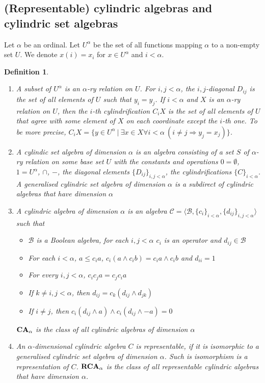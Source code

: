 \documentclass[a4paper]{article}
\theoremstyle{defin}
\newtheorem{defin}{Definition}
\theoremstyle{theorem}
\theoremstyle{prop}
\theoremstyle{lemma}
\theoremstyle{ex}
\theoremstyle{col}
\begin{document}
\subsection{(Representable) cylindric algebras and cylindric set algebras}

Let $\alpha$ be an ordinal. Let $U^{\alpha}$ be the set of all functions mapping $\alpha$ to a non-empty set $U$. We denote $x(i) = x_i$ for
$x \in U^{\alpha}$ and $i < \alpha$.

\begin{defin}
$ $

  \begin{enumerate}
    \item A subset of $U^{\alpha}$ is an $\alpha$-ry relation on $U$. For $i, j < \alpha$, the $i,j$-diagonal $D_{ij}$ is the set of all
    elements of $U$ such that $y_i = y_j$. If $i < \alpha$ and $X$ is an $\alpha$-ry relation on $U$, then
    the $i$-th cylindrification $C_i X$ is the set of all elements of $U$ that agree with some element of $X$ on each coordinate except the
    $i$-th one. To be more precise,
    $C_i X = \{ y \in U^{\alpha} \: | \: \exists x \in X \forall i < \alpha \: (i \neq j \Rightarrow y_j = x_j)\}$.
    \item A cylindic set algebra of dimension $\alpha$ is an algebra consisting of a set $S$ of $\alpha$-ry relation on some base set $U$
    with the constants and operations $0 = \emptyset$, $1 = U^{\alpha}$, $\cap$, $-$, the diagonal elements $\{ D_{ij} \}_{i, j < \alpha}$,
    the cylindrifications $\{ C \}_{i < \alpha}$. A generalised cylindric set algebra of dimension $\alpha$ is a subdirect of
    cylindric algebras that have dimension $\alpha$
    \item A cylindric algebra of dimension $\alpha$ is an algebra $\mathcal{C} = \langle \mathcal{B}, \{ c_i \}_{i < \alpha}, \{ d_{ij} \}_{i, j < \alpha} \rangle$ such that
    \begin{itemize}
      \item $\mathcal{B}$ is a Boolean algebra, for each $i, j < \alpha$ $c_i$ is an operator and $d_{ij} \in \mathcal{B}$
      \item For each $i < \alpha$, $a \leq c_i a$, $c_i (a \land c_i b) = c_i a \land c_i b$ and $d_{ii} = 1$
      \item For every $i, j < \alpha$, $c_i c_j a = c_j c_i a$
      \item If $k \neq i, j < \alpha$, then $d_{ij} = c_k (d_{ij} \land d_{jk})$
      \item If $i \neq j$, then $c_i (d_{ij} \land a) \land c_i (d_{ij} \land - a) = 0$
    \end{itemize}
    ${\bf CA}_{\alpha}$ is the class of all cylindric algebras of dimension $\alpha$
    \item An $\alpha$-dimensional cylindric algebra $C$ is representable, if it is isomorphic to a generalised cylindric set algebra
    of dimension $\alpha$. Such is isomorphism is a representation of $C$.
    ${\bf RCA}_{\alpha}$ is the class of all representable cylindric algebras that have dimension $\alpha$.
  \end{enumerate}
\end{defin}
\end{document}
